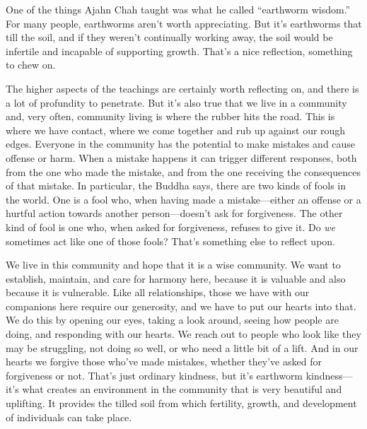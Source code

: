 
One of the things Ajahn Chah taught was what he called ``earthworm 
wisdom.'' For many people, earthworms aren't worth appreciating. But 
it's earthworms that till the soil, and if they weren't continually 
working away, the soil would be infertile and incapable of supporting 
growth. That's a nice reflection, something to chew on.

The higher aspects of the teachings are certainly worth reflecting on, 
and there is a lot of profundity to penetrate. But it's also true that 
we live in a community and, very often, community living is where the 
rubber hits the road. This is where we have contact, where we come 
together and rub up against our rough edges. Everyone in the community 
has the potential to make mistakes and cause offense or harm. When a 
mistake happens it can trigger different responses, both from the one 
who made the mistake, and from the one receiving the consequences of 
that mistake. In particular, the Buddha says, there are two kinds of 
fools in the world. One is a fool who, when having made a 
mistake---either an offense or a hurtful action towards another 
person---doesn't ask for forgiveness. The other kind of fool is one 
who, when asked for forgiveness, refuses to give it. Do \emph{we} 
sometimes act like one of those fools? That's something else to reflect 
upon.

We live in this community and hope that it is a wise community. We want 
to establish, maintain, and care for harmony here, because it is 
valuable and also because it is vulnerable. Like all relationships, 
those we have with our companions here require our generosity, and we 
have to put our hearts into that. We do this by opening our eyes, 
taking a look around, seeing how people are doing, and responding with 
our hearts. We reach out to people who look like they may be 
struggling, not doing so well, or who need a little bit of a lift. And 
in our hearts we forgive those who've made mistakes, whether they've 
asked for forgiveness or not. That's just ordinary kindness, but it's 
earthworm kindness---it's what creates an environment in the community 
that is very beautiful and uplifting. It provides the tilled soil from 
which fertility, growth, and development of individuals can take place.

